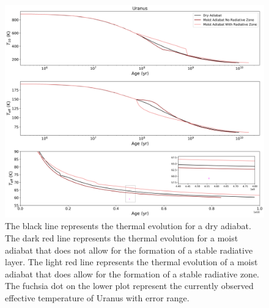 \documentclass[11pt]{ucscthesisbs}
\begin{document}
{{\begin{figure}[ht]
 \centerline{
  \includegraphics[scale=0.5]{figures/dry_moist_radiative_u_cooling_curves_adiabat_comparisons.png}
 }
\caption[Thermal Evolution Curves for Uranus - Adiabat Comparisons]
{The black line represents the thermal evolution for a dry adiabat. The dark red line represents the thermal evolution for a moist adiabat that does not allow for the formation of a stable radiative layer. The light red line represents the thermal evolution of a moist adiabat that does allow for the formation of a stable radiative zone. The fuchsia dot on the lower plot represent the currently observed effective temperature of Uranus with error range. }
\label{fig:evolve_adiabats}
\end{figure}

}}
\end{document}
